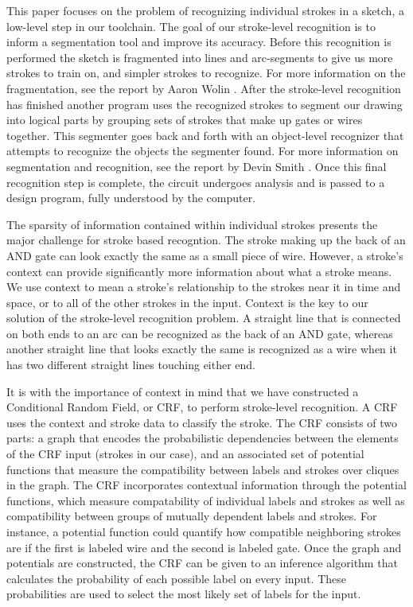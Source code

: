 \documentclass[10pt]{acmsiggraph}               %
\begin{document}
This paper focuses on the problem of recognizing individual strokes in a sketch, a low-level step in our toolchain. The goal of our stroke-level recognition is to inform a segmentation tool and improve its accuracy. Before this recognition is performed the sketch is fragmented into lines and arc-segments to give us more strokes to train on, and simpler strokes to recognize. For more information on the fragmentation, see the report by Aaron Wolin \cite{wolin:fragmenter}.  After the stroke-level recognition has finished another program uses the recognized strokes to segment our drawing into logical parts by grouping sets of strokes that make up gates or wires together.  This segmenter goes back and forth with an object-level recognizer that attempts to recognize the objects the segmenter found.  For more information on segmentation and recognition, see the report by Devin Smith \cite{smith:segmentation}.  Once this final recognition step is complete, the circuit undergoes analysis and is passed to a design program, fully understood by the computer.

The sparsity of information contained within individual strokes presents the major challenge for stroke based recogntion.  The stroke making up the back of an AND gate can look exactly the same as a small piece of wire.  However, a stroke's context can provide significantly more information about what a stroke means.  We use context to mean a stroke's relationship to the strokes near it in time and space, or to all of the other strokes in the input.  Context is the key to our solution of the stroke-level recognition problem.  A straight line that is connected on both ends to an arc can be recognized as the back of an AND gate, whereas another straight line that looks exactly the same is recognized as a wire when it has two different straight lines touching either end.  

It is with the importance of context in mind that we have constructed a Conditional Random Field, or CRF, to perform stroke-level recognition. A CRF uses the context and stroke data to classify the stroke. The CRF consists of two parts: a graph that encodes the probabilistic dependencies between the elements of the CRF input (strokes in our case), and an associated set of potential functions that measure the compatibility between labels and strokes over cliques in the graph.  The CRF incorporates contextual information through the potential functions, which measure compatability of individual labels and strokes as well as compatibility between groups of mutually dependent labels and strokes.  For instance, a potential function could quantify how compatible neighboring strokes are if the first is labeled wire and the second is labeled gate.  Once the graph and potentials are constructed, the CRF can be given to an inference algorithm that calculates the probability of each possible label on every input.  These probabilities are used to select the most likely set of labels for the input.  
\end{document}
